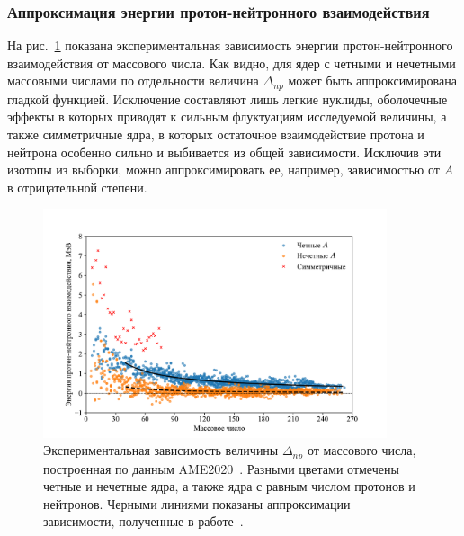 \subsubsection{Аппроксимация энергии протон-нейтронного взаимодействия}
На рис.~\ref{fig:delta_np} показана экспериментальная зависимость энергии протон-нейтронного взаимодействия от массового числа. Как видно, для ядер с четными и нечетными массовыми числами по отдельности величина $\Delta_{np}$ может быть аппроксимирована гладкой функцией. Исключение составляют лишь легкие нуклиды, оболочечные эффекты в которых приводят к сильным флуктуациям исследуемой величины, а также симметричные ядра, в которых остаточное взаимодействие протона и нейтрона особенно сильно и выбивается из общей зависимости. Исключив эти изотопы из выборки, можно аппроксимировать ее, например, зависимостью от $A$ в отрицательной степени.

\begin{figure}
  \centering
  \includegraphics[width=0.9\textwidth]{pics/delta_np.pdf}
  \caption{Экспериментальная зависимость величины $\Delta_{np}$ от массового числа, построенная по данным AME2020~\cite{huang2021}. Разными цветами отмечены четные и нечетные ядра, а также ядра с равным числом протонов и нейтронов. Черными линиями показаны аппроксимации зависимости, полученные в работе~\cite{vladimirova2022}.}
  \label{fig:delta_np}
\end{figure}

